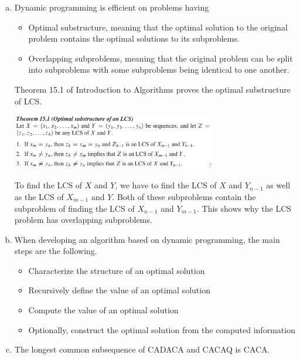 \documentclass[a4paper, 10pt, twoside]{article}
\begin{document}
\begin{enumerate}[a)]
	\item Dynamic programming is efficient on problems having

	      \begin{itemize}
		      \item Optimal substructure, meaning that the optimal solution to the original problem contains the optimal solutions to its subproblems.
		      \item Overlapping subproblems, meaning that the original problem can be split into subproblems with some subproblems being identical to one another.
	      \end{itemize}

	      Theorem 15.1 of Introduction to Algorithms proves the optimal substructure of LCS.

	      \begin{center}
		      \includegraphics[width=0.7\textwidth]{theorem_15.png}
	      \end{center}

	      To find the LCS of $X$ and $Y$, we have to find the LCS of $X$ and $Y_{n-1}$ as well as the LCS of $X_{m-1}$ and $Y$. Both of these subproblems contain the subproblem of finding the LCS of $X_{n-1}$ and $Y_{m-1}$. This shows why the LCS problem has overlapping subproblems.

	\item When developing an algorithm based on dynamic programming, the main steps are the following.

	      \begin{itemize}
		      \item Characterize the structure of an optimal solution
		      \item Recursively define the value of an optimal solution
		      \item Compute the value of an optimal solution
		      \item Optionally, construct the optimal solution from the computed information
	      \end{itemize}

	\item The longest common subsequence of CADACA and CACAQ is CACA.


\end{enumerate}
\end{document}
